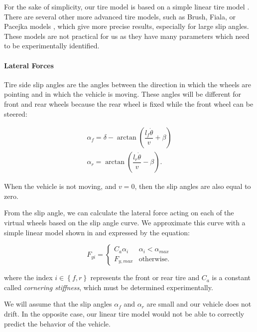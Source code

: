 For the sake of simplicity, our tire model is based on a simple linear tire model . There are several other more advanced tire models, such as Brush, Fiala, or Pacejka models , which give more precise results, especially for large slip angles. These models are not practical for us as they have many parameters which need to be experimentally identified.

\paragraph{Lateral Forces}

Tire side slip angles are the angles between the direction in which the wheels are pointing and in which the vehicle is moving. These angles will be different for front and rear wheels because the rear wheel is fixed while the front wheel can be steered:

\begin{equation}
\begin{aligned}
\alpha_f=\delta - \arctan \left(\dfrac{l_f \dot{\theta}}{v}+\beta\right) \\
\alpha_r=\arctan \left(\dfrac{l_r \dot{\theta}}{v}-\beta\right).
\end{aligned}
\end{equation}

When the vehicle is not moving, and $v=0$, then the slip angles are also equal to zero.

From the slip angle, we can calculate the lateral force acting on each of the virtual wheels based on the slip angle curve. We approximate this curve with a simple linear model shown in  and expressed by the equation:

\begin{equation}
F_{yi}=\begin{cases}
C_a \alpha_i & \alpha_i < \alpha_{max} \\
F_{y,max} & \text{otherwise.}
\end{cases}
\end{equation}

where the index $i\in\left\{f,r\right\}$ represents the front or rear tire and $C_a$ is a constant called \textit{cornering stiffness}, which must be determined experimentally.

We will assume that the slip angles $\alpha_f$ and $\alpha_r$ are small and our vehicle does not drift. In the opposite case, our linear tire model would not be able to correctly predict the behavior of the vehicle.

